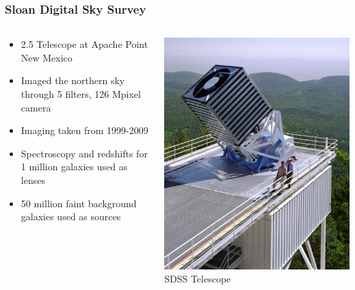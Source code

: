 \documentclass{beamer}
\begin{document}
\frame
{
    \frametitle{Sloan Digital Sky Survey}

    \begin{columns}
        \begin{column}{0.5\textwidth}    
            \begin{itemize}

                \item 2.5 Telescope at Apache Point New Mexico

                \item Imaged the northern sky through 5 filters, 126 Mpixel camera

                \item Imaging taken from 1999-2009

                \item Spectroscopy and redshifts for 1 million galaxies used
                    as {\color{gold} lenses }

                \item 50 million faint background galaxies used as {\color{gold} sources}
                    
            \end{itemize}
        \end{column}
        \begin{column}{0.5\textwidth}
            \begin{center}
                \includegraphics[width=\textwidth]{sdss-telescope.jpg}
                \newline
                {\tiny SDSS Telescope}
            \end{center}
        \end{column}
    \end{columns}
}
\end{document}
